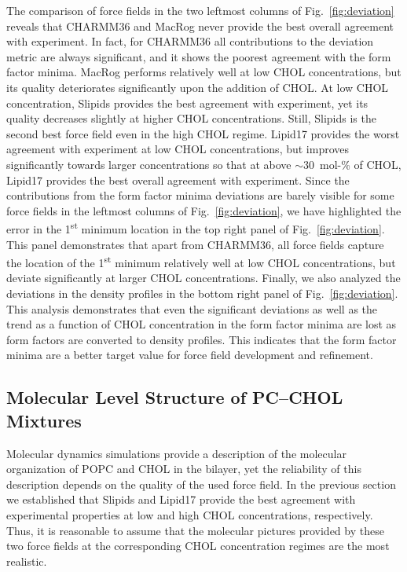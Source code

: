 \documentclass[journal=jctcce]{achemso}
\begin{document}
The comparison of force fields in the two leftmost columns of Fig.~\ref{fig:deviation} reveals that CHARMM36 and MacRog never provide the best overall agreement with experiment. In fact, for CHARMM36 all contributions to the deviation metric are always significant, and it shows the poorest agreement with the form factor minima. MacRog performs relatively well at low CHOL concentrations, but its quality deteriorates significantly upon the addition of CHOL. At low CHOL concentration, Slipids provides the best agreement with experiment, yet its quality decreases slightly at higher CHOL concentrations. Still, Slipids is the second best force field even in the high CHOL regime. Lipid17 provides the worst agreement with experiment at low CHOL concentrations, but improves significantly towards larger concentrations so that at above $\sim$30~mol-\% of CHOL, Lipid17 provides the best overall agreement with experiment. Since the contributions from the form factor minima deviations are barely visible for some force fields in the leftmost columns of Fig.~\ref{fig:deviation}, we have highlighted the error in the 1\textsuperscript{st} minimum location in the top right panel of Fig.~\ref{fig:deviation}. This panel demonstrates that apart from CHARMM36, all force fields capture the location of the 1\textsuperscript{st} minimum relatively well at low CHOL concentrations, but deviate significantly at larger CHOL concentrations. Finally, we also analyzed the deviations in the density profiles in the bottom right panel of Fig.~\ref{fig:deviation}. This analysis demonstrates that even the significant deviations as well as the trend as a function of CHOL concentration in the form factor minima are lost as form factors are converted to density profiles. This indicates that the form factor minima are a better target value for force field development and refinement.

\subsection{Molecular Level Structure of PC--CHOL Mixtures}

Molecular dynamics simulations provide a description of the molecular organization of POPC and CHOL in the bilayer, yet the reliability of this description depends on the quality of the used force field. In the previous section we established that Slipids and Lipid17 provide the best agreement with experimental properties at low and high CHOL concentrations, respectively. Thus, it is reasonable to assume that the molecular pictures provided by these two force fields at the corresponding CHOL concentration regimes are the most realistic.
\end{document}
